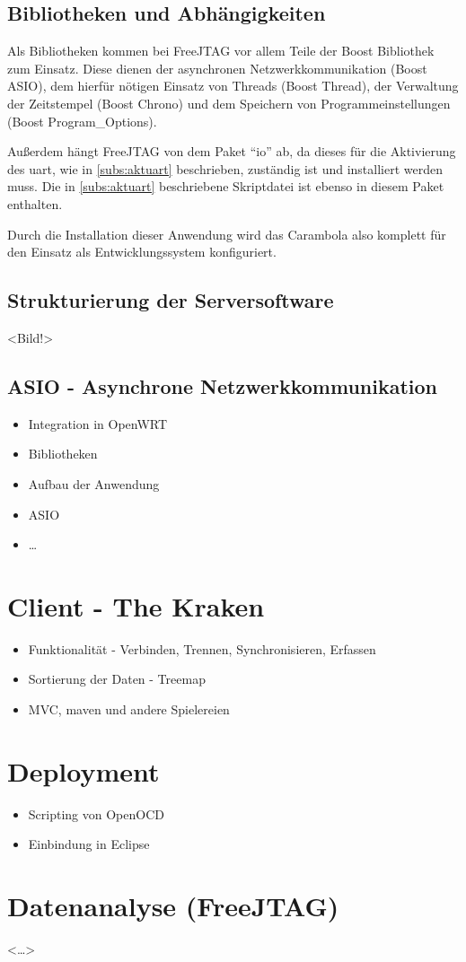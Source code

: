\subsection{Bibliotheken und Abhängigkeiten}
Als Bibliotheken kommen bei FreeJTAG vor allem Teile der Boost Bibliothek zum
Einsatz. Diese dienen der asynchronen Netzwerkkommunikation (Boost ASIO), dem
hierfür nötigen Einsatz von Threads (Boost Thread), der Verwaltung der
Zeitstempel (Boost Chrono) und dem Speichern von Programmeinstellungen (Boost
Program\_Options).

Außerdem hängt FreeJTAG von dem Paket "`io"' ab, da dieses für die Aktivierung
des \gls{uart}, wie in \autoref{subs:aktuart} beschrieben, zuständig ist und
installiert werden muss. Die in \autoref{subs:aktuart} beschriebene Skriptdatei
ist ebenso in diesem Paket enthalten. 

Durch die Installation dieser Anwendung wird das Carambola also komplett für den
Einsatz als Entwicklungssystem konfiguriert.

\subsection{Strukturierung der Serversoftware}
<Bild!>
\subsection{ASIO - Asynchrone Netzwerkkommunikation}
\begin{itemize}
  \item Integration in OpenWRT
  \item Bibliotheken
  \item Aufbau der Anwendung
  \item ASIO
  \item \ldots
\end{itemize}
\section{Client - The Kraken}
\begin{itemize}
  \item Funktionalität - Verbinden, Trennen, Synchronisieren, Erfassen
  \item Sortierung der Daten - Treemap
  \item MVC, maven und andere Spielereien
\end{itemize}
\section{Deployment}
\begin{itemize}
  \item Scripting von OpenOCD
  \item Einbindung in Eclipse
\end{itemize}
\section{Datenanalyse (FreeJTAG)}
<\ldots>